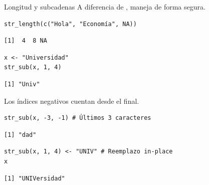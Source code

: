\documentclass[8pt]{beamer}
\begin{document}
\begin{frame}[fragile]{Longitud y subcadenas}
	A diferencia de , maneja  de forma segura.
\begin{lstlisting}[style=RScript]
str_length(c("Hola", "Economía", NA))
\end{lstlisting}
\begin{lstlisting}[style=RConsole]
[1]  4  8 NA
\end{lstlisting}

\begin{lstlisting}[style=RScript]
x <- "Universidad"
str_sub(x, 1, 4)
\end{lstlisting}
\begin{lstlisting}[style=RConsole]
[1] "Univ"
\end{lstlisting}

Los índices negativos cuentan desde el final.
\begin{lstlisting}[style=RScript]
str_sub(x, -3, -1) # Últimos 3 caracteres
\end{lstlisting}
\begin{lstlisting}[style=RConsole]
[1] "dad"
\end{lstlisting}
\begin{lstlisting}[style=RScript]
str_sub(x, 1, 4) <- "UNIV" # Reemplazo in-place
x
\end{lstlisting}
\begin{lstlisting}[style=RConsole]
[1] "UNIVersidad"
\end{lstlisting}
\end{frame}
\end{document}
